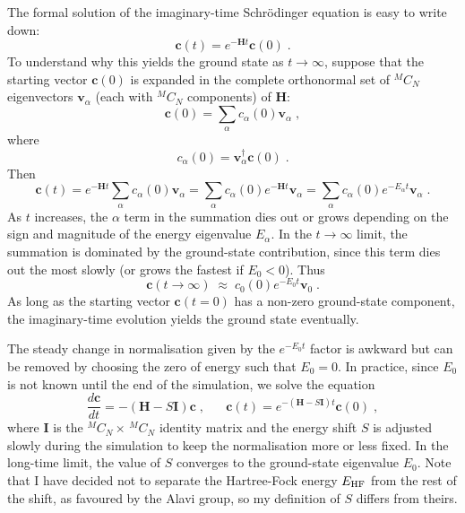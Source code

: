 \documentclass{article}
\newcommand{\bH}{\boldsymbol{H}}
\newcommand{\bc}{\boldsymbol{c}}
\newcommand{\bv}{\boldsymbol{v}}
\newcommand{\bI}{\boldsymbol{I}}
\begin{document}
The formal solution of the imaginary-time Schr\"{o}dinger equation is
easy to write down:
\begin{displaymath}
\bc(t) = e^{-\bH t} \bc(0) \;.
\end{displaymath}
To understand why this yields the ground state as $t \rightarrow
\infty$, suppose that the starting vector $\bc(0)$ is expanded in the
complete orthonormal set of $^MC_N$ eigenvectors $\bv_{\alpha}$ (each
with $^MC_N$ components) of $\bH$:
\begin{displaymath}
\bc(0) = \sum_{\alpha} c_{\alpha}(0) \bv_{\alpha} \;,
\end{displaymath}
where 
\begin{displaymath}
c_{\alpha}^{\,}(0) = \bv_{\alpha}^{\dagger} \bc(0) \;.
\end{displaymath}
Then
\begin{displaymath}
\bc(t) = e^{-\bH t} \sum_{\alpha} c_{\alpha}(0) \bv_{\alpha}
= \sum_{\alpha} c_{\alpha}(0) e^{-\bH t} \bv_{\alpha} = 
\sum_{\alpha} c_{\alpha}(0) e^{-E_{\alpha} t} \bv_{\alpha} \;.
\end{displaymath}
As $t$ increases, the $\alpha$ term in the summation dies out or grows
depending on the sign and magnitude of the energy eigenvalue
$E_{\alpha}$. In the $t\rightarrow \infty$ limit, the summation is
dominated by the ground-state contribution, since this term dies out
the most slowly (or grows the fastest if $E_{0} < 0$). Thus
\begin{displaymath}
\bc(t\rightarrow\infty) \; \approx \; c_0(0) e^{-E_0 t} \bv_0 \;.
\end{displaymath}
As long as the starting vector $\bc(t=0)$ has a non-zero ground-state
component, the imaginary-time evolution yields the ground state
eventually.

The steady change in normalisation given by the $e^{-E_0 t}$ factor is
awkward but can be removed by choosing the zero of energy such that
$E_0 = 0$. In practice, since $E_0$ is not known until the end of the
simulation, we solve the equation
\begin{displaymath}
\frac{d\bc}{dt} = - (\bH - S \bI) \bc \;, \;\;\;\;\;\;
\bc(t) = e^{-(\bH - S \bI) t} \bc(0) \;,
\end{displaymath}
where $\bI$ is the $^MC_N \times \,^MC_N$ identity matrix and the energy
shift $S$ is adjusted slowly during the simulation to keep the
normalisation more or less fixed. In the long-time limit, the value of
$S$ converges to the ground-state eigenvalue $E_0$.
Note that I have decided not to separate the Hartree-Fock energy
$E_{\rm HF}$ from the rest of the shift, as favoured by the Alavi
group, so my definition of $S$ differs from theirs. 
\end{document}
